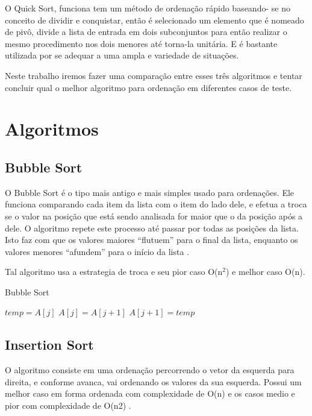 \documentclass[12pt]{article}
\begin{document}
O Quick Sort, funciona tem um método de ordenação rápido baseando-
se no conceito de dividir e conquistar, então é selecionado um elemento que é
nomeado de pivô, divide a lista de entrada em dois subconjuntos para então
realizar o mesmo procedimento nos dois menores até torna-la unitária. E é
bastante utilizada por se adequar a uma ampla e variedade de situações.

Neste trabalho iremos fazer uma comparação entre esses três algoritmos e tentar concluir qual o melhor algoritmo para ordenação em diferentes casos de teste.


\section{Algoritmos}

\subsection{Bubble Sort}

O Bubble Sort é o tipo mais antigo e mais simples usado para ordenações. Ele
funciona comparando cada item da lista com o item do lado dele, e efetua a troca se o
valor na posição que está sendo analisada for maior que o da posição após a dele. O
algoritmo repete este processo até passar por todas as posições da lista. Isto faz com que
os valores maiores “flutuem” para o final da lista, enquanto os valores menores “afundem”
para o início da lista \cite{da2016analise}.
	
	Tal algoritmo usa a estrategia de troca e seu pior caso O(n$^2$) e melhor caso O(n).

	\begin{algorithm}[H]
		\caption{Bubble Sort}
		\begin{algorithmic}[1]
							\State $temp = A[j]$		
							\State $A[j] = A[j+1]$			
							\State $A[j+1] = temp$				
						\EndIf
					\EndFor						
				\EndFor				
			\EndFunction
			
			
		\end{algorithmic}
	\end{algorithm}	
	
\subsection{Insertion Sort}
	O algoritmo consiste em uma ordenação percorrendo o vetor da esquerda para direita, e conforme avanca, vai ordenando os valores da sua esquerda.  Possui um melhor caso em forma ordenada com complexidade de O(n) e os casos medio e pior com complexidade de O(n2) \cite{santoscomparacc}.
\end{document}

